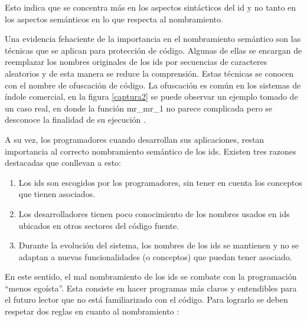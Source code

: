 \documentclass[a4paper,12pt]{report}
\begin{document}
Esto indica que se concentra más en los aspectos sintácticos del id y no tanto en los aspectos semánticos en lo que respecta al nombramiento. 






Una evidencia fehaciente de la importancia en el nombramiento semántico son las técnicas que se aplican para protección de código. Algunas de ellas se encargan de reemplazar los nombres originales de los ids por secuencias de caracteres aleatorios y de esta manera se reduce la comprensión. Estas técnicas se conocen con el nombre de ofuscación de código. La ofuscación es común en los sistemas de índole comercial, en la figura \ref{captura2} se puede observar un ejemplo tomado de un caso real, en donde la función \textsf{mr\_mr\_1} no parece complicada pero se desconoce la finalidad de su ejecución \cite{DFPM05}.

A su vez, los programadores cuando desarrollan sus aplicaciones, restan importancia al correcto nombramiento semántico de los ids. Existen tres razones destacadas que conllevan a esto:

\begin{enumerate}
\itemsep0em%
\item Los ids son escogidos por los programadores, sin tener en cuenta los conceptos que tienen asociados.

\item Los desarrolladores tienen poco conocimiento de los nombres usados en  ids ubicados en otros sectores del código fuente.

\item Durante la evolución del sistema, los nombres de los ids se mantienen y no se adaptan a nuevas funcionalidades (o conceptos) que puedan tener asociado.
\end{enumerate}

En este sentido, el mal nombramiento de los ids se combate con la programación “menos egoísta”. Esta consiste en hacer programas más claros y entendibles para el futuro lector que no está familiarizado con el código. Para lograrlo se deben respetar dos reglas en cuanto al nombramiento \cite{DFPM05,DLHD06}:
\end{document}
